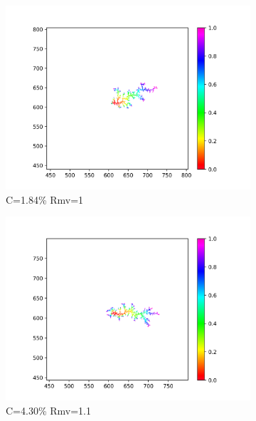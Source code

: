 \documentclass[10pt]{article}
\begin{document}
\begin{figure}[h]
	\centering
	\begin{subfigure}[b]{0.2\textwidth}
		\centering
		\includegraphics[width=\textwidth]{Figure_10_1}
		\caption{C=1.84\% Rmv=1}
	\end{subfigure}
	\hfill
	\begin{subfigure}[b]{0.2\textwidth}
		\centering
		\includegraphics[width=\textwidth]{Figure_10_1.1}
		\caption{C=4.30\% Rmv=1.1}
	\end{subfigure}
	\hfill
	\begin{subfigure}[b]{0.2\textwidth}
		\centering

\end{subfigure}
\end{figure}
\end{document}
